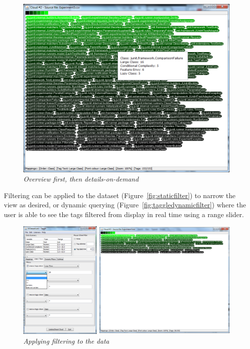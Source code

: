 \begin{figure}[!htb]
  	\centering
   	\includegraphics[scale=0.35]{detailsondemand.png}
  	\caption{\textit{Overview first, then details-on-demand}}
	\label{fig:detailsondemand}
\end{figure}

Filtering can be applied to the dataset (Figure~\vref{fig:staticfilter}) to narrow the view as desired, or dynamic querying (Figure~\vref{fig:taggledynamicfilter}) where the user is able to see the tags filtered from display in real time using a range slider. 

\begin{figure}[!htb]
  	\centering
   	\includegraphics[scale=0.30]{staticfilter.png}
  	\caption{\textit{Applying filtering to the data}}
	\label{fig:staticfilter}
\end{figure}

